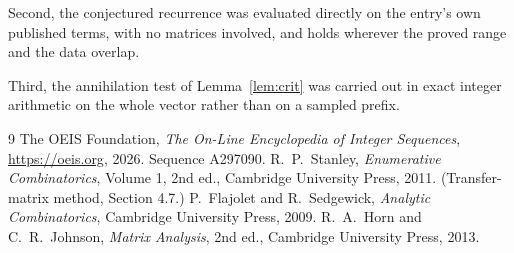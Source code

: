 \documentclass[11pt,a4paper]{article}
\theoremstyle{plain}
\theoremstyle{definition}
\begin{document}
Second, the conjectured recurrence was evaluated directly on the entry's own published terms,
with no matrices involved, and holds wherever the proved range and the data overlap.

Third, the annihilation test of Lemma~\ref{lem:crit} was carried out in exact integer
arithmetic on the whole vector rather than on a sampled prefix.

\begin{thebibliography}{9}
 The OEIS Foundation, \emph{The On-Line Encyclopedia of Integer
Sequences}, \url{https://oeis.org}, 2026. Sequence A297090.
 R.~P.~Stanley, \emph{Enumerative Combinatorics}, Volume 1, 2nd ed.,
Cambridge University Press, 2011. (Transfer-matrix method, Section 4.7.)
 P.~Flajolet and R.~Sedgewick, \emph{Analytic Combinatorics}, Cambridge
University Press, 2009.
 R.~A.~Horn and C.~R.~Johnson, \emph{Matrix Analysis}, 2nd ed., Cambridge
University Press, 2013.
\end{thebibliography}
\end{document}
